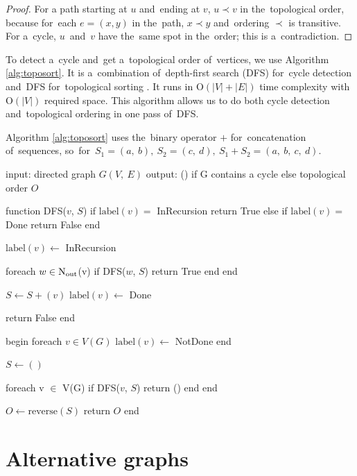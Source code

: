 \begin{proof}
For a path starting at $u$ and~ending at $v$, $u \prec v$ in the~topological order, because for~each $e = (x, y)$ in the~path, $x \prec y$ and~ordering $\prec$ is transitive. For a~cycle, $u$~and~$v$ have the~same spot in the~order; this is a~contradiction.
\end{proof}

To detect a~cycle and~get a~topological order of~vertices, we use Algorithm \ref{alg:toposort}. It is a~combination of~depth-first search (DFS) for~cycle detection and~DFS for~topological sorting \cite{CLRS2022}. It runs in $\mathrm{O}(|V| + |E|)$ time complexity with $\mathrm{O}(|V|)$ required space. This algorithm allows us to do both cycle detection and~topological ordering in one pass of~DFS.

\begin{remark}
Algorithm \ref{alg:toposort} uses the~binary operator $+$ for~concatenation of~sequences, so~for~$S_1 = (a,\ b),\ S_2=(c,\ d),\ S_1 + S_2 = (a,\ b,\ c,\ d)$.
\end{remark}

\begin{algorithm}[float, caption={Topological sort with cycle detection}, label={alg:toposort}]
input: directed graph $G(V,\ E)$
output: () if G contains a cycle else topological order $O$

function DFS($v$, $S$)
  if $\mathrm{label}(v) =$ InRecursion
    return True
  else if $\mathrm{label}(v) =$ Done
    return False
  end

  $\mathrm{label}(v) \gets$ InRecursion

  foreach $w \in \operatorname{N_{out}}$(v)
    if DFS($w$, $S$)
      return True
    end
  end

  $S \gets S + (v)$
  $\mathrm{label}(v) \gets$ Done

  return False
end

begin
  foreach $v \in V(G)$ 
    $\mathrm{label}(v) \gets$ NotDone
  end

  $S \gets ()$

  foreach v $\in$ V(G)
    if DFS($v$, $S$)
      return ()
    end
  end

  $O \gets \mathrm{reverse}(S)$
  return $O$
end
\end{algorithm}

\section{Alternative graphs}
\label{sec:alt_graph}

